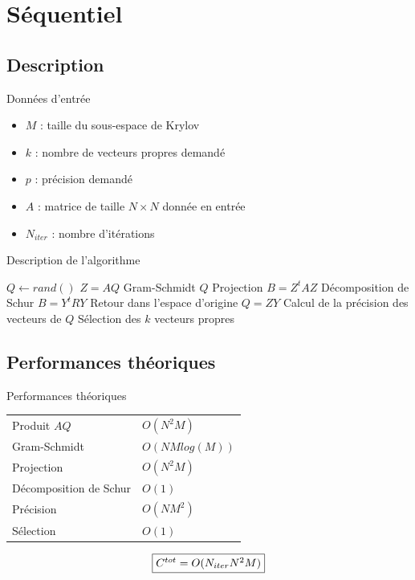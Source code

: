 \documentclass[9.5pt]{beamer}
\begin{document}
\section{Séquentiel}
	\subsection{Description}
		\begin{frame}{Données d'entrée}
			\begin{itemize}
				\item $M$ : taille du sous-espace de Krylov
				\item $k$ : nombre de vecteurs propres demandé
				\item $p$ : précision demandé
				\item $A$ : matrice de taille $N\times N$ donnée en entrée
				\item $N_{iter}$ : nombre d'itérations
			\end{itemize}
		\end{frame}
		\begin{frame}{Description de l'algorithme}
			\begin{algorithmic}
				\State $Q \gets rand()$
					\State $Z = AQ$
					\State Gram-Schmidt $Q$
					\State Projection $B = Z^tAZ$
					\State Décomposition de Schur $B = Y^tRY$
					\State Retour dans l'espace d'origine $Q = ZY$
					\State Calcul de la précision des vecteurs de $Q$
					\State Sélection des $k$ vecteurs propres
				\EndWhile
			\end{algorithmic}
		\end{frame}

	\subsection{Performances théoriques}
		\begin{frame}{Performances théoriques}
			\begin{tabular}{ l l }
				Produit $AQ$ & $O(N^2M)$ \\
				Gram-Schmidt & $O(NMlog(M))$ \\
				Projection & $O(N^2M)$ \\
				Décomposition de Schur & $O(1)$ \\
				Précision & $O(NM^2)$ \\
				Sélection & $O(1)$ \\
			\end{tabular}

			
			$$
			\fbox{$C^{tot} = O(N_{iter}N^2M)$}
			$$
		\end{frame}
\end{document}
